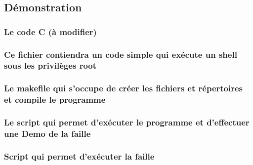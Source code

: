 \documentclass[12pt,a4paper]{article}
\begin{document}
   		\subsection{Démonstration}
			\subsubsection{Le code C (à modifier) } 
			  
			\subsubsection{Ce fichier contiendra un code simple qui exécute un shell sous les privilèges root} 
			 
			\subsubsection{Le makefile qui s'occupe de créer les fichiers et répertoires et compile le programme}  
			
			\subsubsection{Le script qui permet d'exécuter le programme et d'effectuer une Demo de la faille} 
			  

			\subsubsection{Script qui permet d'exécuter la faille}   	
			
            
\end{document}
